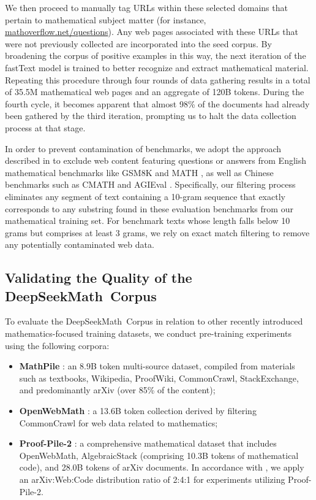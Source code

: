\begin{itemize}[topsep=0pt]
We then proceed to manually tag URLs within these selected domains that pertain to mathematical subject matter (for instance, \url{mathoverflow.net/questions}). Any web pages associated with these URLs that were not previously collected are incorporated into the seed corpus. By broadening the corpus of positive examples in this way, the next iteration of the fastText model is trained to better recognize and extract mathematical material. Repeating this procedure through four rounds of data gathering results in a total of 35.5M mathematical web pages and an aggregate of 120B tokens. During the fourth cycle, it becomes apparent that almost 98\% of the documents had already been gathered by the third iteration, prompting us to halt the data collection process at that stage.

In order to prevent contamination of benchmarks, we adopt the approach described in \cite{deepseek-coder} to exclude web content featuring questions or answers from English mathematical benchmarks like GSM8K \citep{gsm8k} and MATH \citep{MATH}, as well as Chinese benchmarks such as CMATH \citep{wei2023cmath} and AGIEval \citep{agieval}. Specifically, our filtering process eliminates any segment of text containing a 10-gram sequence that exactly corresponds to any substring found in these evaluation benchmarks from our mathematical training set. For benchmark texts whose length falls below 10 grams but comprises at least 3 grams, we rely on exact match filtering to remove any potentially contaminated web data.

\subsection{Validating the Quality of the DeepSeekMath~Corpus}

To evaluate the DeepSeekMath~Corpus in relation to other recently introduced mathematics-focused training datasets, we conduct pre-training experiments using the following corpora:

\begin{itemize}[topsep=0pt]
    \item \textbf{MathPile} \citep{mathpile}: an 8.9B token multi-source dataset, compiled from materials such as textbooks, Wikipedia, ProofWiki, CommonCrawl, StackExchange, and predominantly arXiv (over 85\% of the content);
    \item \textbf{OpenWebMath} \citep{openwebmath}: a 13.6B token collection derived by filtering CommonCrawl for web data related to mathematics;
    \item \textbf{Proof-Pile-2} \citep{llemma}: a comprehensive mathematical dataset that includes OpenWebMath, AlgebraicStack (comprising 10.3B tokens of mathematical code), and 28.0B tokens of arXiv documents. In accordance with \cite{llemma}, we apply an arXiv:Web:Code distribution ratio of 2:4:1 for experiments utilizing Proof-Pile-2.
\end{itemize}


\end{itemize}

